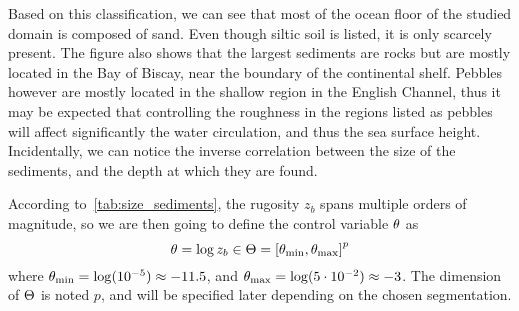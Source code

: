 \documentclass[../../Main_ManuscritThese.tex]{subfiles}
\newcommand{\zob}{z_b}
\begin{document}
Based on this classification, we can see that most of the ocean floor
of the studied domain is composed of sand. Even though siltic soil is listed,
it is only scarcely present. The figure also shows that the largest
sediments are rocks but are mostly located in the Bay of Biscay, near
the boundary of the continental shelf. Pebbles however are mostly
located in the shallow region in the English Channel, thus it may be
expected that controlling the roughness in the regions listed as
pebbles will affect significantly the water circulation, and thus the sea
surface height. Incidentally, we can notice the inverse correlation
between the size of the sediments, and the depth at which they are
found.

According to~\cref{tab:size_sediments}, the rugosity $\zob$ spans
multiple orders of magnitude, so we are then going to define the control
variable $\theta$ as
\begin{equation}
  \kk = \log \zob \in \Kspace = \interval{\kk_{\min}}{\kk_{\max}}^p
\end{equation}
where $\theta_{\min} = \log(10^{-5}) \approx -11.5$, and
$\theta_{\max} = \log(5\cdot 10^{-2}) \approx -3$.  The dimension of
$\Theta$ is noted $p$, and will be specified later depending on the
chosen segmentation.
\end{document}
